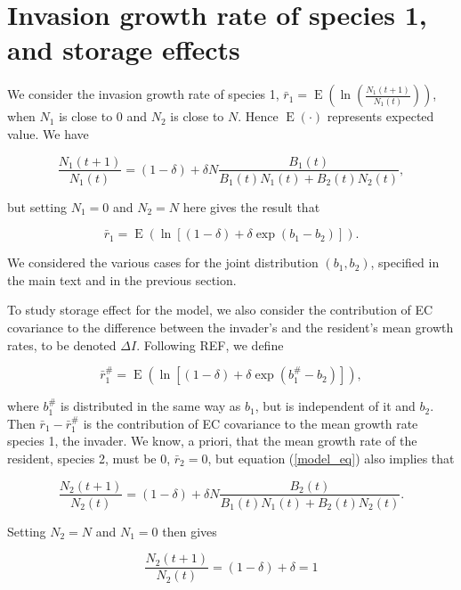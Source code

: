\documentclass[letterpaper,11pt]{article}
\DeclareMathOperator{\EX}{E}%
\begin{document}
\section{Invasion growth rate of species 1, and storage effects} \label{sect:IGR}

We consider the invasion growth rate of species 1, $\bar r_1=\EX(\ln (\frac{N_1(t+1)}{N_1(t)}))$, when $N_1$ is close to 0 and $N_2$ is close to $N$. Hence $\EX(\cdot)$ represents expected value. We have 

\begin{equation}
\frac{N_1(t+1)}{N_1(t)}=(1-\delta)+\delta N \frac{B_1(t)}{B_1(t)N_1(t)+B_2(t)N_2(t)},  \label{sp1_Nt+1_over_Nt}
\end{equation}

\noindent but setting $N_1=0$ and $N_2=N$ here gives the result that

\begin{equation}
\bar r_1=\EX(\ln [(1-\delta)+\delta \exp(b_1-b_2)]).  \label{rbar1_E}
\end{equation}

\noindent We considered the various cases for the joint distribution $(b_1,b_2)$, specified in the main text and in the previous section. 

To study storage effect for the model, we also consider the contribution of EC covariance to the difference between the invader's and the resident's mean growth rates, to be denoted $\Delta I$. Following REF, we define 

\begin{equation}
\bar r_1^\#=\EX(\ln [(1-\delta)+\delta \exp(b_1^\#-b_2)]),  \label{rbar1sharp_E}
\end{equation}

\noindent where $b_1^\#$ is distributed in the same way as $b_1$, but is independent of it and $b_2$. Then $\bar r_1 - \bar r_1^\#$ is the contribution of EC covariance to the mean growth rate species 1, the invader. We know, a priori, that the mean growth rate of the resident, species 2, must be 0, $\bar r_2 =0$, but equation (\ref{model_eq}) also implies that

\begin{equation}
\frac{N_2(t+1)}{N_2(t)}=(1-\delta)+\delta N \frac{B_2(t)}{B_1(t)N_1(t)+B_2(t)N_2(t)}.  \label{sp2_Nt+1_over_Nt}
\end{equation}

\noindent Setting $N_2=N$ and $N_1=0$ then gives

\begin{equation}
\frac{N_2(t+1)}{N_2(t)}=(1-\delta)+\delta=1  \label{sp2_Nt+1_over_Nt_simp}
\end{equation}
\end{document}
